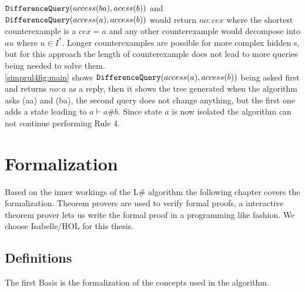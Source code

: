 $\textnormal{\texttt{DifferenceQuery}}(access(ba),acess(b))$ and \newline$\textnormal{\texttt{DifferenceQuery}}(access(a),access(b))$ would return $no:cex$ where the shortest counterexample is a $cex=a$ and any other counterexample would decompose into $au$ where $u\in I^*$. Longer counterexamples are possible for more complex hidden s, but for this approach the length of counterexample does not lead to more queries being needed to solve them. \\
\autoref{simprul4fig:main} shows $\textnormal{\texttt{DifferenceQuery}}(access(a),access(b))$ being asked first and returns $no:a$ as a reply, then it shows the tree generated when the algorithm asks \oquery(aa) and \oquery(ba), the second query does not change anything, but the first one adds a state leading to $a\vdash a\#b$. Since state $a$ is now isolated the algorithm can not continue performing Rule 4.


\chapter{Formalization}\label{chap:three}
Based on the inner workings of the L$\#$ algorithm the following chapter covers the formalization. Theorem provers are used to verify formal proofs, a interactive theorem prover lets us write the formal proof in a programming like fashion. We choose Isabelle/HOL for this thesis.
\section{Definitions}
The first Basis is the formalization of the concepts used in the algorithm. 
